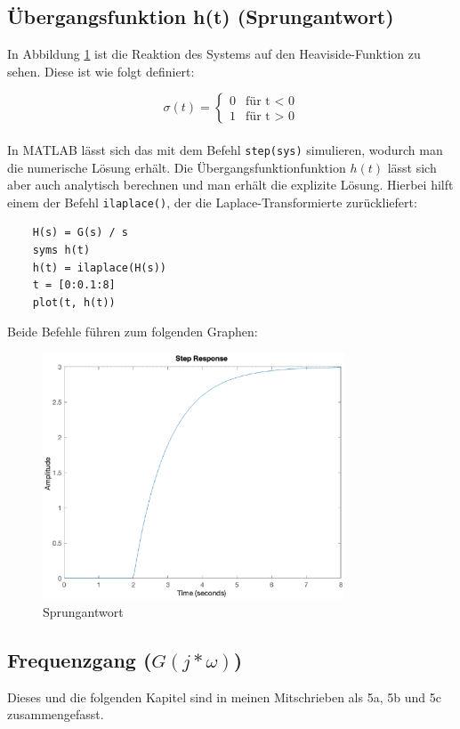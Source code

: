 \subsection{Übergangsfunktion h(t) (Sprungantwort)}

In Abbildung \ref{fig:sprung} ist die Reaktion des Systems auf den Heaviside-Funktion zu sehen. Diese ist wie folgt definiert:

\[
\sigma (t) = \begin{cases} 0 & \text{für t < 0} \\ 1 & \text{für t > 0} \end{cases}  
\]
\\
In MATLAB lässt sich das mit dem Befehl \texttt{step(sys)} simulieren, wodurch man die numerische Lösung erhält. Die Übergangsfunktionfunktion $h(t)$ lässt sich aber auch analytisch berechnen und man erhält die explizite Lösung. Hierbei hilft einem der Befehl \texttt{ilaplace()}, der die Laplace-Transformierte zurückliefert:

\begin{lstlisting}
    H(s) = G(s) / s
    syms h(t)
    h(t) = ilaplace(H(s))
    t = [0:0.1:8]
    plot(t, h(t))
\end{lstlisting} 

Beide Befehle führen zum folgenden Graphen:

\begin{figure}[H]
    \label{fig:sprung}
    \centering
    \includegraphics[width=0.8\textwidth]{Bilder/SprungantwortPT1Tt.eps}
    \caption{Sprungantwort}
 \end{figure}


\subsection{Frequenzgang ($G(j * \omega)$)}
Dieses und die folgenden Kapitel sind in meinen Mitschrieben als 5a, 5b und 5c zusammengefasst.

